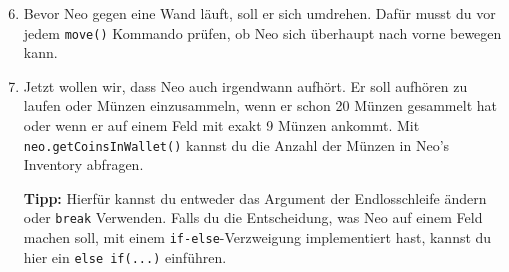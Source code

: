 \begin{enumerate}\setcounter{enumi}{5}
	\item
	Bevor Neo gegen eine Wand läuft, soll er sich umdrehen.
	Dafür musst du vor jedem \lstinline{move()} Kommando prüfen, ob Neo sich überhaupt nach vorne bewegen kann.
	
	\item
	Jetzt wollen wir, dass Neo auch irgendwann aufhört.
	Er soll aufhören zu laufen oder Münzen einzusammeln, wenn er schon 20 Münzen gesammelt hat oder wenn er auf einem Feld mit exakt 9 Münzen ankommt.
	Mit \lstinline{neo.getCoinsInWallet()} kannst du die Anzahl der Münzen in Neo's Inventory abfragen.
	
	\textbf{Tipp:} Hierfür kannst du entweder das Argument der Endlosschleife ändern oder \lstinline{break} Verwenden.
	Falls du die Entscheidung, was Neo auf einem Feld machen soll, mit einem \lstinline{if-else}-Verzweigung implementiert hast, kannst du hier ein \lstinline{else if(...)} einführen.
\end{enumerate}
\newpage
